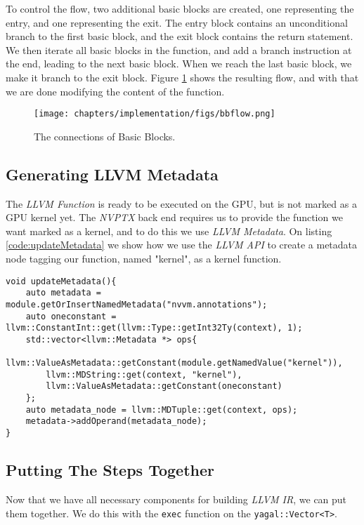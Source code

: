 To control the flow, two additional basic blocks are created, one representing the entry, and one representing the exit. The entry block contains an unconditional branch to the first basic block, and the exit block contains the return statement. We then iterate all basic blocks in the function, and add a branch instruction at the end, leading to the next basic block. When we reach the last basic block, we make it branch to the exit block. Figure \ref{fig:bbflow} shows the resulting flow, and with that we are done modifying the content of the function.

\begin{figure}[!htb]
    \center
    \label{fig:bbflow}
    \texttt{[image: chapters/implementation/figs/bbflow.png]}
    \caption{The connections of Basic Blocks.}
\end{figure}

\subsection{Generating LLVM Metadata} \label{sec:metadata}
The \textit{LLVM Function} is ready to be executed on the GPU, but is not marked as a GPU kernel yet. The \textit{NVPTX} back end requires us to provide the function we want marked as a kernel, and to do this we use \textit{LLVM Metadata}. On listing \ref{code:updateMetadata} we show how we use the \textit{LLVM API} to create a metadata node tagging our function, named "kernel", as a kernel function.

\begin{lstlisting}[caption={The updateMetadata function.}, label={code:updateMetadata}]
void updateMetadata(){
    auto metadata = module.getOrInsertNamedMetadata("nvvm.annotations");
    auto oneconstant = llvm::ConstantInt::get(llvm::Type::getInt32Ty(context), 1);
    std::vector<llvm::Metadata *> ops{
        llvm::ValueAsMetadata::getConstant(module.getNamedValue("kernel")),
        llvm::MDString::get(context, "kernel"),
        llvm::ValueAsMetadata::getConstant(oneconstant)
    };
    auto metadata_node = llvm::MDTuple::get(context, ops); 
    metadata->addOperand(metadata_node);
}
\end{lstlisting}

\subsection{Putting The Steps Together}\label{cha:puttingStepsTogether}
Now that we have all necessary components for building \textit{LLVM IR}, we can put them together. We do this with the \texttt{exec} function on the \texttt{yagal::Vector<T>}.

